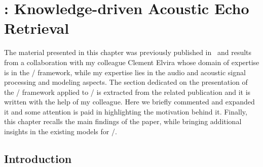 \chapter{: Knowledge-driven Acoustic Echo Retrieval}\label{ch:blaster}

\vspace{-2.5em}
  \synopsisChBlaster

\mynewline
The material presented in this chapter was previously published in~\cite{di2020blaster} and results from a collaboration with my colleague Clement Elvira whose domain of expertise is in the \CDdef/ framework, while my expertise lies in the audio and acoustic signal processing and modeling aspects.
The section dedicated on the presentation of the \CD/ framework applied to \AER/ is extracted from the related publication and it is written with the help of my colleague.
Here we briefly commented and expanded it and some attention is paid in highlighting the motivation behind it.
Finally, this chapter recalls the main findings of the paper, while bringing additional insights in the existing models for \AER/.

\section{Introduction}
\label{sec:blaster:intro}

